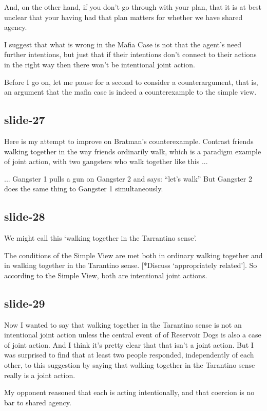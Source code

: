 \documentclass[12pt,\papersize]{extarticle}
\begin{document}
And, on the other hand, if you don’t go through with your plan, that it is at best
unclear that your having had that plan matters for whether we have shared agency.

I suggest that what is wrong in the Mafia Case is not that the agent’s need further
intentions, but just that if their intentions don’t connect to their actions in the
right way then there won’t be intentional joint action.

Before I go on, let me pause for a second to consider a counterargument,
that is, an argument that the mafia case is indeed a counterexample to the simple view.

\subsection{slide-27}
Here is my attempt to improve on Bratman’s counterexample.
Contrast friends walking together in the way friends ordinarily walk,
which is a paradigm example of joint action,
with two gangsters who walk together like this ...

... Gangster 1 pulls a gun on Gangster 2 and says: “let’s walk”
But Gangster 2 does the same thing to Gangster 1 simultaneously.

\subsection{slide-28}
We might call this ‘walking together in the Tarrantino sense’.

The conditions of the Simple View are met both in ordinary walking together
and in walking together in the Tarantino sense.  [*Discuss ‘appropriately related’].
So according to the Simple View, both are intentional joint actions.

\subsection{slide-29}
Now I wanted to say that walking together in the Tarantino sense
is not an intentional joint action unless the central event of of Reservoir Dogs
is also a case of joint action.
And I think it’s pretty clear that that isn’t a joint action.
But I was surprised to find that at least two people responded, independently of each other,
to this suggestion by saying that walking together in the Tarantino sense really is a joint action.

My opponent reasoned that each is acting intentionally, and that coercion is no
bar to shared agency.
\end{document}
